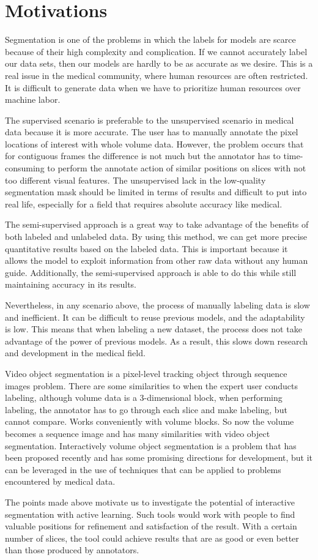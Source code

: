 \section{Motivations}
\label{sec:motivation}
Segmentation is one of the problems in which the labels for models are scarce because of their high complexity and complication. If we cannot accurately label our data sets, then our models are hardly to be as accurate as we desire. This is a real issue in the medical community, where human resources are often restricted. It is difficult to generate data when we have to prioritize human resources over machine labor. 

The supervised scenario is preferable to the unsupervised scenario in medical data because it is more accurate. The user has to manually annotate the pixel locations of interest with whole volume data. However, the problem occurs that for contiguous frames the difference is not much but the annotator has to time-consuming to perform the annotate action of similar positions on slices with not too different visual features. The unsupervised lack in the low-quality segmentation mask should be limited in terms of results and difficult to put into real life, especially for a field that requires absolute accuracy like medical.

The semi-supervised approach is a great way to take advantage of the benefits of both labeled and unlabeled data. By using this method, we can get more precise quantitative results based on the labeled data. This is important because it allows the model to exploit information from other raw data without any human guide. Additionally, the semi-supervised approach is able to do this while still maintaining accuracy in its results.

Nevertheless, in any scenario above, the process of manually labeling data is slow and inefficient. It can be difficult to reuse previous models, and the adaptability is low. This means that when labeling a new dataset, the process does not take advantage of the power of previous models. As a result, this slows down research and development in the medical field.

Video object segmentation is a pixel-level tracking object through sequence images problem. There are some similarities to when the expert user conducts labeling, although volume data is a 3-dimensional block, when performing labeling, the annotator has to go through each slice and make labeling, but cannot compare. Works conveniently with volume blocks. So now the volume becomes a sequence image and has many similarities with video object segmentation. Interactively volume object segmentation is a problem that has been proposed recently and has some promising directions for development, but it can be leveraged in the use of techniques that can be applied to problems encountered by medical data.

The points made above motivate us to investigate the potential of interactive segmentation with active learning. Such tools would work with people to find valuable positions for refinement and satisfaction of the result. With a certain number of slices, the tool could achieve results that are as good or even better than those produced by annotators.

